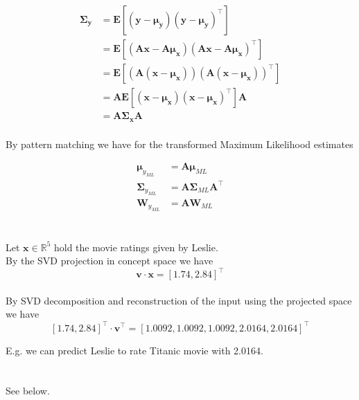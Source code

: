 \documentclass[11pt]{article}
\newcommand{\exercise}{\section{}}
\newcommand{\tf}[1]{{#1}^{\intercal}}
\begin{document}
\begin{align*}
\mathbf{\Sigma_y} &= \mathbf{E}[ (\mathbf{y} - \mathbf{\mu_y}) \tf{(\mathbf{y} - \mathbf{\mu_y})} ] \\
&= \mathbf{E}[ ( \mathbf{A} \mathbf{x} - \mathbf{A} \mathbf{\mu_x} ) \tf{( \mathbf{A} \mathbf{x} - \mathbf{A} \mathbf{\mu_x} ) } ] \\
&= \mathbf{E}[ ( \mathbf{A} (\mathbf{x} - \mathbf{\mu_x}) ) \tf{( \mathbf{A} (\mathbf{x} - \mathbf{\mu_x}) ) } ] \\
&= \mathbf{A} \mathbf{E}[ ( \mathbf{x} - \mathbf{\mu_x} ) \tf{( \mathbf{x} - \mathbf{\mu_x} ) } ] \mathbf{A} \\
&= \mathbf{A} \mathbf{\Sigma_x} \mathbf{A} \\
\end{align*}

By pattern matching we have for the transformed Maximum Likelihood estimates

\begin{align*}
\mathbf{\mu}_{y_{ML}} &= \mathbf{A} \mathbf{\mu}_{ML} \\
\mathbf{\Sigma}_{y_{ML}} &= \mathbf{A} \mathbf{\Sigma}_{ML} \tf{\mathbf{A}} \\
\mathbf{W}_{y_{ML}} &= \mathbf{A} \mathbf{W}_{ML}
\end{align*}

\exercise

Let $\mathbf{x} \in \mathbb{R}^5$ hold the movie ratings given by Leslie.
\\
\noindent By the SVD projection in concept space we have
$$\mathbf{v}  \cdot \mathbf{x} = \tf{[1.74, 2.84]}$$
\\
\noindent By SVD decomposition and reconstruction of the input using the projected space we have
$$ \tf{[1.74, 2.84]} \cdot \tf{\mathbf{v}} = \tf{[1.0092, 1.0092, 1.0092, 2.0164, 2.0164]} $$

\noindent E.g. we can predict Leslie to rate Titanic movie with 2.0164.

\exercise

See below.
\end{document}
